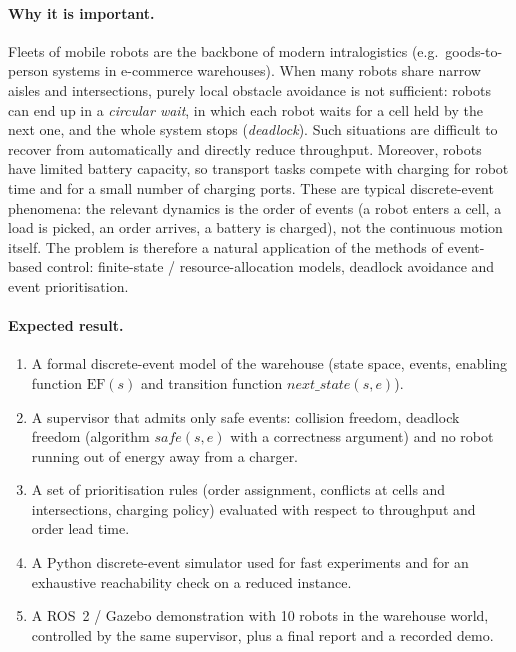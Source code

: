\documentclass[11pt,a4paper]{article}
\newcommand{\EF}{\mathrm{EF}}
\begin{document}
\paragraph{Why it is important.}
Fleets of mobile robots are the backbone of modern intralogistics
(e.g.\ goods-to-person systems in e-commerce warehouses). When many robots
share narrow aisles and intersections, purely local obstacle avoidance is
not sufficient: robots can end up in a \emph{circular wait}, in which each
robot waits for a cell held by the next one, and the whole system stops
(\emph{deadlock}). Such situations are difficult to recover from
automatically and directly reduce throughput. Moreover, robots have
limited battery capacity, so transport tasks compete with charging for
robot time and for a small number of charging ports. These are typical
discrete-event phenomena: the relevant dynamics is the order of events
(a robot enters a cell, a load is picked, an order arrives, a battery is
charged), not the continuous motion itself. The problem is therefore a
natural application of the methods of event-based control:
finite-state / resource-allocation models, deadlock avoidance and
event prioritisation.

\paragraph{Expected result.}
\begin{enumerate}[leftmargin=*]
  \item A formal discrete-event model of the warehouse (state space,
        events, enabling function $\EF(s)$ and transition function
        $\mathit{next\_state}(s,e)$).
  \item A supervisor that admits only safe events: collision freedom,
        deadlock freedom (algorithm $\mathit{safe}(s,e)$ with a correctness
        argument) and no robot running out of energy away from a charger.
  \item A set of prioritisation rules (order assignment, conflicts at cells
        and intersections, charging policy) evaluated with respect to
        throughput and order lead time.
  \item A Python discrete-event simulator used for fast experiments and for
        an exhaustive reachability check on a reduced instance.
  \item A ROS~2 / Gazebo demonstration with 10 robots in the warehouse
        world, controlled by the same supervisor, plus a final report and
        a recorded demo.
\end{enumerate}
\end{document}
